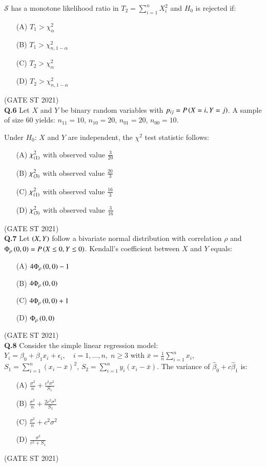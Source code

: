 \documentclass[journal,12pt,onecolumn]{IEEEtran}
\theoremstyle{remark}
\begin{document}
$\mathcal{S}$ has a monotone likelihood ratio in $T_2 = \sum_{i=1}^n X_i^2$ and $H_0$ is rejected if:
\begin{enumerate}
\item[(A)] $T_1 > \chi_\alpha^2$
\item[(B)] $T_1 > \chi_{n,1-\alpha}^2$
\item[(C)] $T_2 > \chi_\alpha^2$
\item[(D)] $T_2 > \chi_{n,1-\alpha}^2$
\end{enumerate}
\hfill (GATE ST 2021) \\


\textbf{Q.6}
Let $X$ and $Y$ be binary random variables with $p_{ij} = P\left(X = i, Y = j\right)$.  
A sample of size $60$ yields: $n_{11} = 10$, $n_{10} = 20$, $n_{01} = 20$, $n_{00} = 10$.

Under $H_0$: $X$ and $Y$ are independent, the $\chi^2$ test statistic follows:

\begin{enumerate}
\item[(A)] $\chi^2_{\left(1\right)}$ with observed value $\frac{3}{20}$
\item[(B)] $\chi^2_{\left(3\right)}$ with observed value $\frac{20}{3}$
\item[(C)] $\chi^2_{\left(1\right)}$ with observed value $\frac{16}{3}$
\item[(D)] $\chi^2_{\left(3\right)}$ with observed value $\frac{3}{16}$
\end{enumerate}
\hfill (GATE ST 2021) \\


\textbf{Q.7}
Let $\left(X,Y\right)$ follow a bivariate normal distribution with correlation $\rho$ and $\Phi_\rho\left(0,0\right)= P\left(X \leq 0, Y \leq 0\right)$.  
Kendall's coefficient between $X$ and $Y$ equals:
\begin{enumerate}
\item[(A)] $4\Phi_\rho\left(0,0\right) - 1$
\item[(B)] $4\Phi_\rho\left(0,0\right)$
\item[(C)] $4\Phi_\rho\left(0,0\right) + 1$
\item[(D)] $\Phi_\rho\left(0,0\right)$
\end{enumerate}
\hfill (GATE ST 2021) \\

\textbf{Q.8}
Consider the simple linear regression model:
$
Y_i = \beta_0 + \beta_1 x_i + \epsilon_i, \quad i = 1, \dots, n, \; n \geq 3
$
with $\bar{x} = \frac{1}{n} \sum_{i=1}^n x_i$, $S_1 = \sum_{i=1}^n (x_i - \bar{x})^2$, $S_2 = \sum_{i=1}^n y_i(x_i - \bar{x})$.  
The variance of $\hat{\beta}_0 + c \hat{\beta}_1$ is:
\begin{enumerate}
\item[(A)] $\frac{\sigma^2}{n} + \frac{c^2\sigma^2}{S_1}$
\item[(B)] $\frac{\sigma^2}{n} + \frac{2c^2\sigma^2}{S_1}$
\item[(C)] $\frac{\sigma^2}{n} + c^2\sigma^2$
\item[(D)] $\frac{\sigma^2}{c^2 + S_1}$
\end{enumerate}
\hfill (GATE ST 2021) \\
\end{document}
